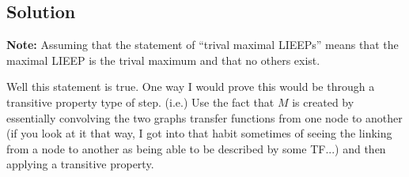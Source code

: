 \documentclass[]{article}
\numberwithin{equation}{section}
\begin{document}
\subsection*{Solution}
\textbf{Note:} 
Assuming that the statement of ``trival maximal LIEEPs'' means that the maximal LIEEP is the trival maximum and that no others exist.

Well this statement is true. 
One way I would prove this would be through a transitive property type of step. 
(i.e.) Use the fact that $M$ is created by essentially convolving the two graphs transfer functions from one node to another (if you look at it that way, I got into that habit sometimes of seeing the linking from a node to another as being able to be described by some TF...) and then applying a transitive property.









% 

% 

% 

\end{document}
